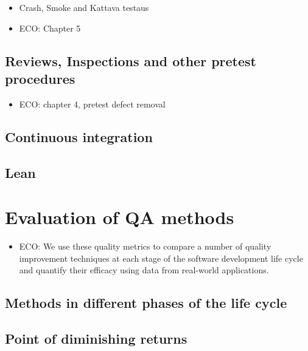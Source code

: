 ﻿\documentclass[12pt,a4paper,finnish]{tutthesis}
\begin{document}
 \begin{itemize}
 
 \item Crash, Smoke and Kattava testaus
 
 \item ECO: Chapter 5
 
 \end{itemize}
 
 \subsection{Reviews, Inspections and other pretest procedures}
 
 \begin{itemize}
  
 \item ECO: chapter 4, pretest defect removal
 
 \end{itemize}
 
 \subsection{Continuous integration}
 
 \subsection{Lean}
 
 \section{Evaluation of QA methods}
 
 \begin{itemize}
  
 \item ECO: We use these quality metrics to compare a number of quality improvement techniques at each stage of the software development life cycle and quantify their efficacy using data from real-world applications.
 
 \end{itemize}
 
 \subsection{Methods in different phases of the life cycle}
 
 \subsection{Point of diminishing returns}
 
\end{document}
